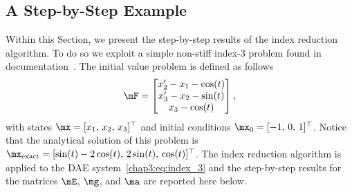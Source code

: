 \subsection{A Step-by-Step Example}
\label{chap3:sec:step_by_step}

Within this Section, we present the step-by-step results of the index reduction algorithm. To do so we exploit a simple non-stiff index-3 problem found in \Wolfram{}~\Mathematica{} documentation~\cite{mathematica}. The initial value problem is defined as follows
%
\begin{equation}
  \label{chap3:eq:index_3}
  \mF = \begin{bmatrix}
    x^{\prime}_{2} - x_{1} - \cos(t) \\
    x^{\prime}_{3} - x_{2} - \sin(t) \\
    x_{3} - \cos(t)
  \end{bmatrix},
\end{equation}
%
with states $\mx = [x_{1}, \, x_{2}, \, x_{3}]^\top$ and initial conditions $\mx_{0} = [-1, \, 0, \, 1]^\top$. Notice that the analytical solution of this problem is $\mx_\text{exact} = [\sin(t) - 2\cos(t), \, 2\sin(t), \, \cos(t)]^\top$. The index reduction algorithm is applied to the \ac{DAE} system~\eqref{chap3:eq:index_3} and the step-by-step results for the matrices $\mE$, $\mg$, and $\ma$ are reported here below.
%
